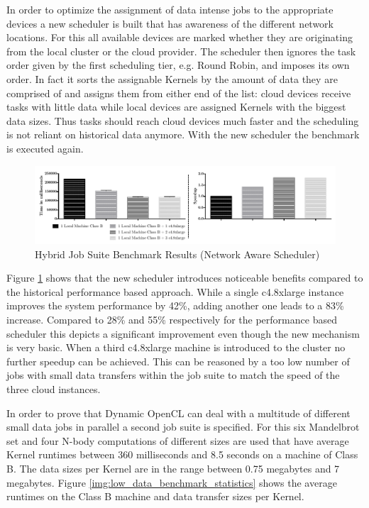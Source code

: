 In order to optimize the assignment of data intense jobs to the appropriate devices a new scheduler is built that has awareness of the different network locations. For this all available devices are marked whether they are originating from the local cluster or the cloud provider. The scheduler then ignores the task order given by the first scheduling tier, e.g. Round Robin, and imposes its own order. In fact it sorts the assignable Kernels by the amount of data they are comprised of and assigns them from either end of the list: cloud devices receive tasks with little data while local devices are assigned Kernels with the biggest data sizes. Thus tasks should reach cloud devices much faster and the scheduling is not reliant on historical data anymore. With the new scheduler the benchmark is executed again.

\begin{figure}[H]	
	\includegraphics[width=1.0\textwidth]{images/hybrid_full_benchmark_network_based.pdf}
	\centering
	\caption{Hybrid Job Suite  Benchmark Results (Network Aware Scheduler)}
	\label{img:hybrid_benchmark_results_network_aware}
\end{figure}

Figure \ref{img:hybrid_benchmark_results_network_aware} shows that the new scheduler introduces noticeable benefits compared to the historical performance based approach. While a single c4.8xlarge instance improves the system performance by 42\%, adding another one leads to a 83\% increase. Compared to 28\% and 55\% respectively for the performance based scheduler this depicts a significant improvement even though the new mechanism is very basic. When a third c4.8xlarge machine is introduced to the cluster no further speedup can be achieved. This can be reasoned by a too low number of jobs with small data transfers within the job suite to match the speed of the three cloud instances.

In order to prove that Dynamic OpenCL can deal with a multitude of different small data jobs in parallel a second job suite is specified. For this six Mandelbrot set and four N-body computations of different sizes are used that have average Kernel runtimes between 360 milliseconds and 8.5 seconds on a machine of Class B. The data sizes per Kernel are in the range between 0.75 megabytes and 7 megabytes. Figure \ref{img:low_data_benchmark_statistics} shows the average runtimes on the Class B machine and data transfer sizes per Kernel.

